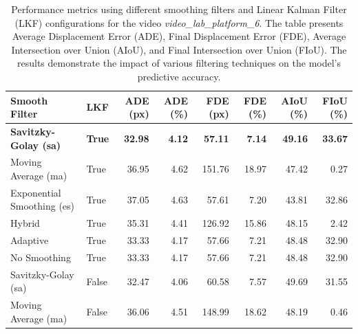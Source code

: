 \documentclass[12pt,oneside]{book} %
\begin{document}
\begin{table}[H]
    \centering
    \caption{Performance metrics using different smoothing filters and Linear Kalman Filter (LKF) configurations for the video \textit{video\_lab\_platform\_6}. The table presents Average Displacement Error (ADE), Final Displacement Error (FDE), Average Intersection over Union (AIoU), and Final Intersection over Union (FIoU). The results demonstrate the impact of various filtering techniques on the model’s predictive accuracy.}
    \begin{adjustbox}{max width=\textwidth}
        \begin{tabular}{llrrrrrr}
            \toprule
            \textbf{Smooth Filter}       & \textbf{LKF}  & \textbf{ADE (px)} & \textbf{ADE (\%)} & \textbf{FDE (px)} & \textbf{FDE (\%)} & \textbf{AIoU (\%)} & \textbf{FIoU (\%)} \\
            \midrule
            \textbf{Savitzky-Golay (sa)} & \textbf{True} & \textbf{32.98}    & \textbf{4.12}     & \textbf{57.11}    & \textbf{7.14}     & \textbf{49.16}     & \textbf{33.67}     \\
            Moving Average (ma)          & True          & 36.95             & 4.62              & 151.76            & 18.97             & 47.42              & 0.27               \\
            Exponential Smoothing (es)   & True          & 37.05             & 4.63              & 57.61             & 7.20              & 43.81              & 32.86              \\
            Hybrid                       & True          & 35.31             & 4.41              & 126.92            & 15.86             & 48.15              & 2.42               \\
            Adaptive                     & True          & 33.33             & 4.17              & 57.66             & 7.21              & 48.48              & 32.90              \\
            No Smoothing                 & True          & 33.33             & 4.17              & 57.66             & 7.21              & 48.48              & 32.90              \\
            Savitzky-Golay (sa)          & False         & 32.47             & 4.06              & 60.58             & 7.57              & 49.69              & 31.55              \\
            Moving Average (ma)          & False         & 36.06             & 4.51              & 148.99            & 18.62             & 48.19              & 0.46               \\

\end{tabular}
\end{adjustbox}
\end{table}
\end{document}
